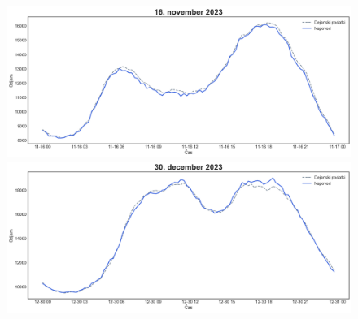 \documentclass[a4paper, 11pt]{article}
\begin{document}
\begin{figure}[!ht]
    \centering
    \begin{minipage}[c]{0.48\linewidth}
        \includegraphics[width=\linewidth]{napoved_3.png}
    \end{minipage}
    \hfill
    \begin{minipage}[c]{0.48\linewidth}
        \includegraphics[width=\linewidth]{napoved_4.png}
    \end{minipage}
\end{figure}
\end{document}
